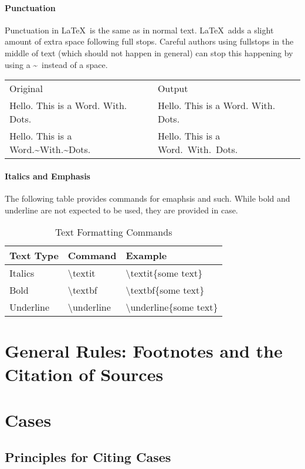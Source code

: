 \documentclass{book}
\newcommand{\s}{\textbackslash}
\newcommand{\latex}{\LaTeX}
\begin{document}
\subsubsection{Punctuation}
Punctuation in \latex~is the same as in normal text. \latex~adds a slight amount of extra space following full stops. Careful authors using fullstops in the middle of text (which should not happen in general) can stop this happening by using a \textasciitilde~instead of a space.

\begin{tabular}{l l}
Original & Output \\
Hello. This is a Word. With. Dots. & Hello. This is a Word. With. Dots. \\

Hello. This is a Word.{\textasciitilde}With.{\textasciitilde}Dots. &Hello. This is a Word.~With.~Dots.
\end{tabular}

\subsubsection{Italics and Emphasis}
The following table provides commands for emaphsis and such. While bold and underline are not expected to be used, they are provided in case.

\begin{table}[H]
\centering
\begin{tabular}{|l|l|l|}
\hline
Text Type & Command & Example \\ \hline
Italics & {\s}textit  & {\s}textit\{some text\}\\
Bold & {\s}textbf  & {\s}textbf\{some text\}\\
Underline & {\s}underline & {\s}underline\{some text\} \\
\hline
\end{tabular}
\caption{Text Formatting Commands}
\end{table}

\chapter{General Rules: Footnotes and the Citation of Sources}



\chapter{Cases}

\section{Principles for Citing Cases}
\end{document}
